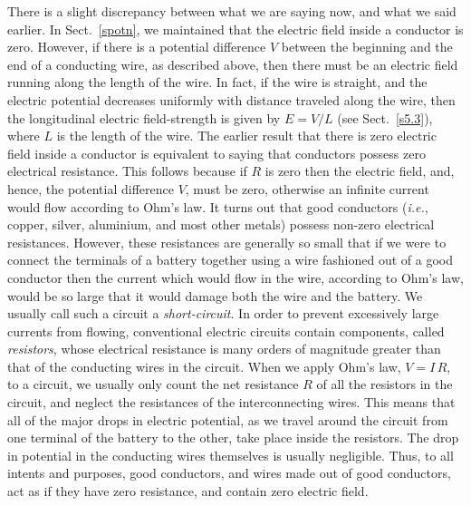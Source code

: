 There is a slight discrepancy between what we are saying
now, and what we said earlier. In Sect.~\ref{spotn}, we maintained that the
 electric field inside a conductor  is zero. However,  if there is a potential difference
$V$ between the beginning and the end of a conducting wire, as described above, 
 then there must be an
electric field running along the length of the wire. In fact, if the
wire is straight, and the electric potential decreases uniformly with
distance traveled along the wire, then the longitudinal electric
field-strength is given by $E = V/L$ (see Sect.~\ref{s5.3}), where $L$ is the length of the wire. 
The earlier result that there is zero electric field inside a
conductor is equivalent to saying that conductors possess zero electrical
resistance. This follows because if $R$ is zero then the electric field, and, hence, the potential
difference $V$, must be zero, otherwise an infinite current would flow
according to Ohm's law. It turns out that good conductors ({\em i.e.}, 
copper, silver, aluminium, and most other metals)  possess 
  non-zero electrical
resistances. However, these resistances are generally so small that
if we were to connect the terminals of a battery together using a
wire fashioned out of a good conductor then the current which would flow
in the wire, according to Ohm's law, would be so large that it would
damage both the wire and the battery. We usually call such a circuit
a {\em short-circuit}. In order to prevent excessively large currents from
flowing, conventional electric circuits contain components, called {\em resistors},
whose electrical resistance is many orders of magnitude greater than that
of the conducting wires in the circuit. When we apply Ohm's
law, $V=I\,R$,  to a circuit, we usually only count the net resistance $R$ of 
all the
resistors in the circuit, and  neglect the resistances of the interconnecting
wires. This means that all of the major drops in electric potential, as we
travel around the circuit from one terminal of the battery to the other,
take place inside the resistors. The drop in potential in the conducting
wires themselves is usually negligible. 
Thus, to all intents and purposes, good conductors, and wires
made out of good conductors,  act as if they
have zero resistance, and contain zero electric field. 

